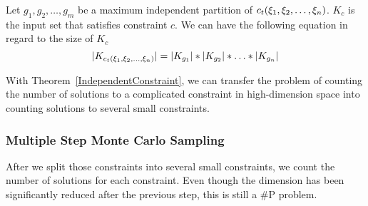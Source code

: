 \begin{theorem}
      \label{IndependentConstraint}
      Let $g_{1}, g_{2}, \ldots, g_{m}$ be a maximum independent partition of
      $c_t({\xi}_{1},{\xi}_{2},\ldots,{\xi}_{n})$.
      $K_c$ is the input set that satisfies constraint $c$. We can have the following
      equation in regard to the size of $K_c$
      $$|K_{c_t({\xi}_{1},{\xi}_{2},\ldots,{\xi}_{n})}| = |K_{g_{1}}|*|K_{g_{2}}|*\ldots*|K_{g_{n}}|$$
\end{theorem}

With Theorem~\ref{IndependentConstraint}, we can transfer the problem of
counting the number of solutions to a complicated constraint in high-dimension
space into counting solutions to several small constraints. 



\subsubsection{Multiple Step Monte Carlo Sampling}

After we split those constraints into several small constraints, we count the
number of solutions for each constraint. Even though the dimension has been
significantly reduced after the previous step, this is still a \#P problem. 

